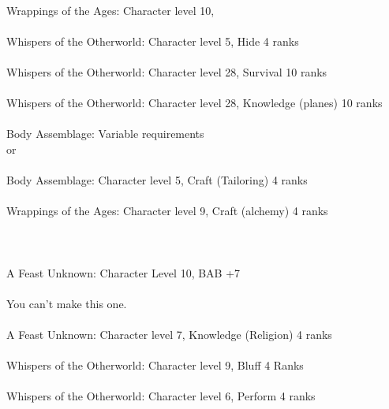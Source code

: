 \begin{multicols}{2}
\begin{small}
\\
Wrappings of the Ages: Character level 10, \\
\\
Whispers of the Otherworld: Character level 5, Hide 4 ranks\\
\\
Whispers of the Otherworld: Character level 28, Survival 10 ranks\\
\\
Whispers of the Otherworld: Character level 28, Knowledge (planes) 10 ranks\\
\\
Body Assemblage: Variable requirements\\
or \\
\\
Body Assemblage: Character level 5, Craft (Tailoring) 4 ranks\\
\\
Wrappings of the Ages: Character level 9, Craft (alchemy) 4 ranks\\
\\
\\
\\
A Feast Unknown: Character Level 10, BAB +7\\
\\
You can't make this one.\\
\\
A Feast Unknown: Character level 7, Knowledge (Religion) 4 ranks\\
\\
Whispers of the Otherworld: Character level 9, Bluff 4 Ranks\\
\\
Whispers of the Otherworld: Character level 6, Perform 4 ranks\\
\\

\end{small}
\end{multicols}

